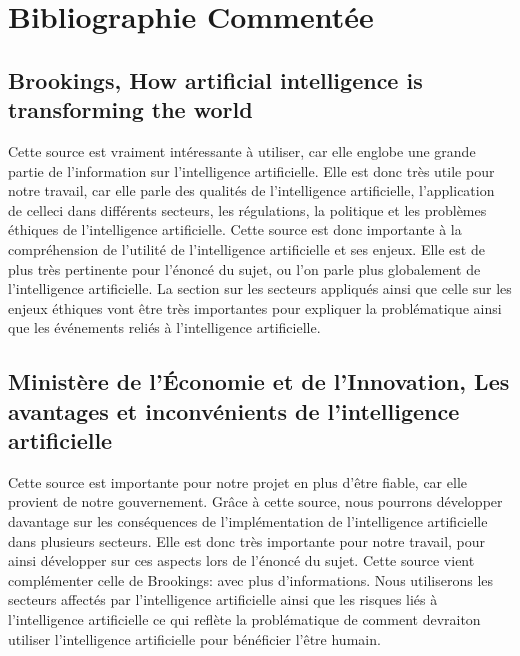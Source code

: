 \documentclass[letterpaper,10pt,french]{sphinxmanual}
\begin{document}
\section{Bibliographie Commentée}
\label{\detokenize{biblio_commented:bibliographie-commentee}}\label{\detokenize{biblio_commented::doc}}

\subsection{Brookings, How artificial intelligence is transforming the world}
\label{\detokenize{biblio_commented:brookings-how-artificial-intelligence-is-transforming-the-world}}

Cette source est vraiment intéressante à utiliser, car elle englobe une
grande partie de l’information sur l’intelligence artificielle. Elle est donc très utile pour notre
travail, car elle parle des qualités de l’intelligence artificielle, l’application de
celle\sphinxhyphen{}ci dans différents secteurs, les régulations, la politique et les problèmes éthiques de
l’intelligence artificielle. Cette source est donc importante à la compréhension de l’utilité
de l’intelligence artificielle et ses enjeux. Elle est de plus très pertinente pour l’énoncé du sujet,
ou l’on parle plus globalement de l’intelligence artificielle. La section sur les secteurs appliqués
ainsi que celle sur les enjeux éthiques vont être très importantes pour expliquer la problématique
ainsi que les événements reliés à l’intelligence artificielle.


\subsection{Ministère de l’Économie et de l’Innovation, Les avantages et inconvénients de l’intelligence artificielle}
\label{\detokenize{biblio_commented:ministere-de-l-economie-et-de-l-innovation-les-avantages-et-inconvenients-de-l-intelligence-artificielle}}

Cette source est importante pour notre projet en plus d’être fiable,
car elle provient de notre gouvernement. Grâce à cette source, nous pourrons développer davantage
sur les conséquences de l’implémentation de l’intelligence artificielle dans plusieurs secteurs.
Elle est donc très importante pour notre travail, pour ainsi développer sur ces aspects lors de l’énoncé du sujet.
Cette source vient complémenter celle de Brookings: 
avec plus d’informations. Nous utiliserons les secteurs affectés par l’intelligence artificielle ainsi
que les risques liés à l’intelligence artificielle ce qui reflète la problématique de comment devrait\sphinxhyphen{}on
utiliser l’intelligence artificielle pour bénéficier l’être humain.
\end{document}

